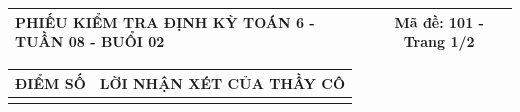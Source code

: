 \documentclass[12pt,a4paper]{article}
\begin{document}
\pagestyle{empty}

\noindent
\begin{tabularx}{\linewidth}{|X|c|}
\hline
\textbf{PHIẾU KIỂM TRA ĐỊNH KỲ TOÁN 6 - TUẦN 08 - BUỔI 02} & \textbf{Mã đề: 101 - Trang 1/2} \\
\hline
\end{tabularx}

\vspace{1mm}

\noindent
\begin{tabularx}{\linewidth}{|p{3.2cm}|X|}
\hline
\centering\textbf{ĐIỂM SỐ} & \centering\textbf{LỜI NHẬN XÉT CỦA THẦY CÔ} \tabularnewline
\hline
\rule{0pt}{1.8cm} & \tabularnewline
\hline
\end{tabularx}

\vspace{1.2mm}
\end{document}
